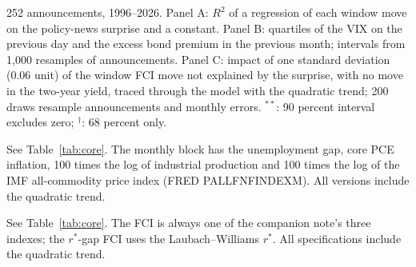 \documentclass[11pt]{article}
\newcommand{\rs}{r^{*}}
\begin{document}
\begin{table}[H]\centering\small
\caption{Policy news beyond interest rates}\label{tab:scope}
{\setlength{\tabcolsep}{4pt}\resizebox{\ifdim\width>\linewidth\linewidth\else\width\fi}{!}{}}
\par\smallskip\begin{minipage}{0.95\textwidth}\footnotesize 252 announcements, 1996--2026. Panel A: $R^2$ of a regression of each window move on the policy-news surprise and a constant. Panel B: quartiles of the VIX on the previous day and the excess bond premium in the previous month; intervals from 1,000 resamples of announcements. Panel C: impact of one standard deviation (0.06 unit) of the window FCI move not explained by the surprise, with no move in the two-year yield, traced through the model with the quadratic trend; 200 draws resample announcements and monthly errors. $^{**}$: 90 percent interval excludes zero; $^{\dagger}$: 68 percent only.\end{minipage}
\end{table}
\begin{table}[H]\centering\small
\caption{Commodity prices and industrial production added to the monthly model}\label{tab:com}
{\setlength{\tabcolsep}{4pt}\resizebox{\ifdim\width>\linewidth\linewidth\else\width\fi}{!}{}}
\par\smallskip\begin{minipage}{0.95\textwidth}\footnotesize See Table~\ref{tab:core}. The monthly block has the unemployment gap, core PCE inflation, 100 times the log of industrial production and 100 times the log of the IMF all-commodity price index (FRED PALLFNFINDEXM). All versions include the quadratic trend.\end{minipage}
\end{table}
\begin{table}[H]\centering\small
\caption{Different adjustments of the two-year yield: unemployment gap (percentage points)}\label{tab:rob}
{\setlength{\tabcolsep}{4pt}\resizebox{\ifdim\width>\linewidth\linewidth\else\width\fi}{!}{}}
\par\smallskip\begin{minipage}{0.95\textwidth}\footnotesize See Table~\ref{tab:core}. The FCI is always one of the companion note's three indexes; the $\rs$-gap FCI uses the Laubach--Williams $\rs$. All specifications include the quadratic trend.\end{minipage}
\end{table}
\end{document}
